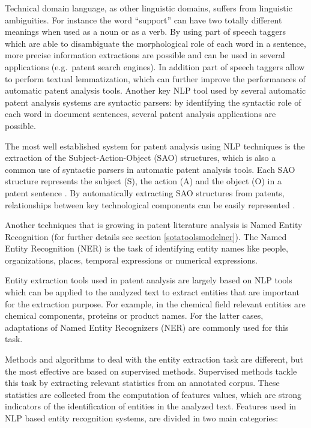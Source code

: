 \documentclass[b5paper,]{book}
\theoremstyle{definition}
\theoremstyle{definition}
\theoremstyle{definition}
\theoremstyle{remark}
\begin{document}
Technical domain language, as other linguistic domains, suffers from
linguistic ambiguities. For instance the word ``support'' can have two
totally different meanings when used as a noun or as a verb. By using
part of speech taggers which are able to disambiguate the morphological
role of each word in a sentence, more precise information extractions
are possible and can be used in several applications (e.g.~patent search
engines). In addition part of speech taggers allow to perform textual
lemmatization, which can further improve the performances of automatic
patent analysis tools. Another key NLP tool used by several automatic
patent analysis systems are syntactic parsers: by identifying the
syntactic role of each word in document sentences, several patent
analysis applications are possible.

The most well established system for patent analysis using NLP
techniques is the extraction of the Subject-Action-Object (SAO)
structures, which is also a common use of syntactic parsers in automatic
patent analysis tools. Each SAO structure represents the subject (S),
the action (A) and the object (O) in a patent sentence
\citep{yoon2011identifying}. By automatically extracting SAO structures
from patents, relationships between key technological components can be
easily represented
\citep{yoon2013identifying, choi2011sao, park2011identifying}.

Another techniques that is growing in patent literature analysis is
Named Entity Recognition (for further details see section
\ref{sotatoolsmodelner}). The Named Entity Recognition (NER) is the task
of identifying entity names like people, organizations, places, temporal
expressions or numerical expressions.

Entity extraction tools used in patent analysis are largely based on NLP
tools which can be applied to the analyzed text to extract entities that
are important for the extraction purpose. For example, in the chemical
field relevant entities are chemical components, proteins or product
names. For the latter cases, adaptations of Named Entity Recognizers
(NER) are commonly used for this task.

Methods and algorithms to deal with the entity extraction task are
different, but the most effective are based on supervised methods.
Supervised methods tackle this task by extracting relevant statistics
from an annotated corpus. These statistics are collected from the
computation of features values, which are strong indicators of the
identification of entities in the analyzed text. Features used in NLP
based entity recognition systems, are divided in two main categories:
\end{document}
